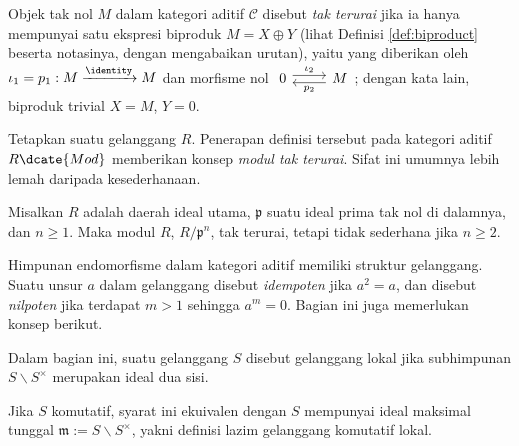 \begin{definition}
	Objek tak nol $M$ dalam kategori aditif $\mathcal{C}$ disebut \emph{tak terurai} jika ia hanya mempunyai satu ekspresi biproduk $M = X \oplus Y$ (lihat Definisi \ref{def:biproduct} beserta notasinya, dengan mengabaikan urutan), yaitu yang diberikan oleh $\iota_1 = p_1: M \xrightarrow{\identity} M$ dan morfisme nol $\begin{tikzcd} 0 \arrow[yshift=0.6ex, r, "\iota_2"] & M \arrow[yshift=-0.6ex, l, "p_2"] \end{tikzcd}$; dengan kata lain, biproduk trivial $X=M$, $Y=0$.
\end{definition}

Tetapkan suatu gelanggang $R$. Penerapan definisi tersebut pada kategori aditif $R\dcate{Mod}$ memberikan konsep \emph{modul tak terurai}. Sifat ini umumnya lebih lemah daripada kesederhanaan. 
\begin{example}
	Misalkan $R$ adalah daerah ideal utama, $\mathfrak{p}$ suatu ideal prima tak nol di dalamnya, dan $n \geq 1$. Maka modul $R$, $R/\mathfrak{p}^n$, tak terurai, tetapi tidak sederhana jika $n \geq 2$.
\end{example}

Himpunan endomorfisme dalam kategori aditif memiliki struktur gelanggang. Suatu unsur $a$ dalam gelanggang disebut \emph{idempoten} jika $a^2=a$, dan disebut \emph{nilpoten} jika terdapat $m > 1$ sehingga $a^m=0$. Bagian ini juga memerlukan konsep berikut. 
\begin{definition}\label{def:noncommutative-local-ring}
	Dalam bagian ini, suatu gelanggang $S$ disebut gelanggang lokal jika subhimpunan $S \smallsetminus S^\times$ merupakan ideal dua sisi.
\end{definition}
Jika $S$ komutatif, syarat ini ekuivalen dengan $S$ mempunyai ideal maksimal tunggal $\mathfrak{m} := S \smallsetminus S^\times$, yakni definisi lazim gelanggang komutatif lokal.

